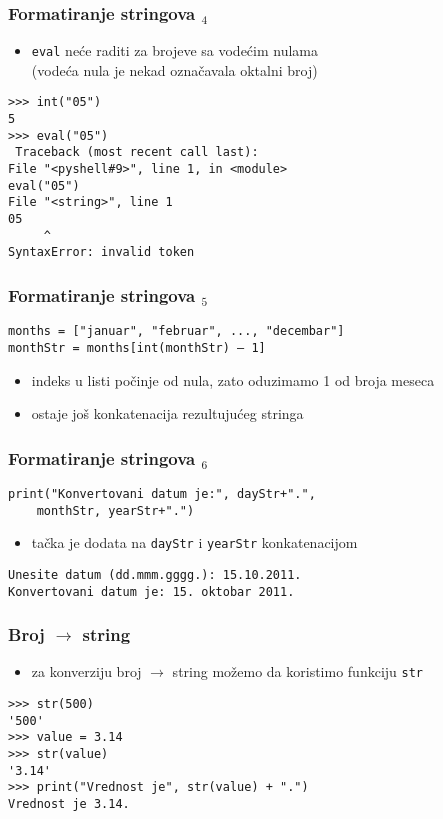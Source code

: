 \documentclass[utf8,compress]{beamer}
\begin{document}
\begin{frame}[fragile]
  \frametitle{Formatiranje stringova $_4$}
  \begin{itemize}
    \item \texttt{eval} neće raditi za brojeve sa vodećim nulama\\ (vodeća nula je nekad označavala oktalni broj)
  \end{itemize}
\begin{verbatim}
>>> int("05")
5
>>> eval("05")
 Traceback (most recent call last):
File "<pyshell#9>", line 1, in <module>
eval("05")
File "<string>", line 1
05
     ^
SyntaxError: invalid token
\end{verbatim}
\end{frame}

\begin{frame}[fragile]
  \frametitle{Formatiranje stringova $_5$}
\begin{verbatim}
months = ["januar", "februar", ..., "decembar"]
monthStr = months[int(monthStr) – 1]
\end{verbatim}
  \begin{itemize}
    \item indeks u listi počinje od nula, zato oduzimamo 1 od broja meseca
    \item ostaje još konkatenacija rezultujućeg stringa
  \end{itemize}
\end{frame}

\begin{frame}[fragile]
  \frametitle{Formatiranje stringova $_6$}
\begin{verbatim}
print("Konvertovani datum je:", dayStr+".", 
    monthStr, yearStr+".")
\end{verbatim}
  \begin{itemize}
    \item tačka je dodata na \texttt{dayStr} i \texttt{yearStr} konkatenacijom
  \end{itemize}
\begin{verbatim}
Unesite datum (dd.mmm.gggg.): 15.10.2011.
Konvertovani datum je: 15. oktobar 2011.
\end{verbatim}
\end{frame}

\begin{frame}[fragile]
  \frametitle{Broj $\rightarrow$ string}
  \begin{itemize}
    \item za konverziju broj $\rightarrow$ string možemo da koristimo funkciju \texttt{str}
  \end{itemize}
\begin{verbatim}
>>> str(500)
'500'
>>> value = 3.14
>>> str(value)
'3.14'
>>> print("Vrednost je", str(value) + ".")
Vrednost je 3.14.
\end{verbatim}
\end{frame}
\end{document}
